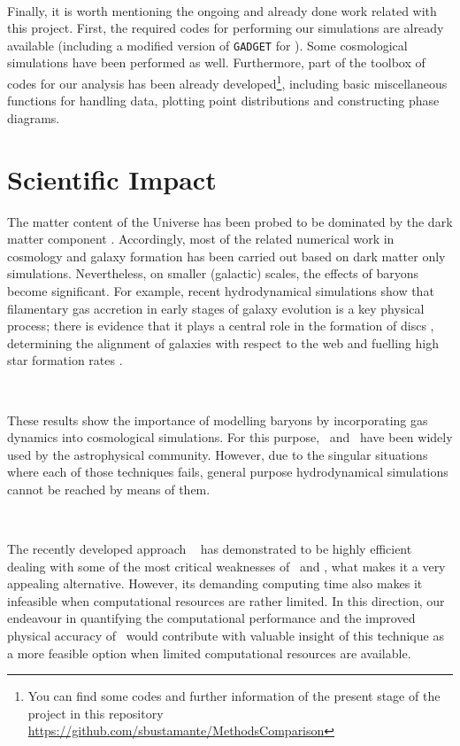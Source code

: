 \documentclass[a4,useAMS,usenatbib,usegraphicx,12pt]{article}
\begin{document}
\

Finally, it is worth mentioning the ongoing and already done work related with 
this project. First, the required codes for performing our simulations are already
available (including a modified version of \texttt{GADGET} for \VPH). Some
cosmological simulations have been performed as well. Furthermore, part of the 
toolbox of codes for our analysis has been already developed\footnote{You can 
find some codes and further information of the present stage of the project in 
this repository \url{https://github.com/sbustamante/MethodsComparison}}, 
including basic miscellaneous functions for handling data, plotting point 
distributions and constructing phase diagrams.


\section{Scientific Impact}
The matter content of the Universe has been probed to be dominated by the dark 
matter component \citep{Planck13XVI}. Accordingly, most of the related numerical 
work in cosmology and galaxy formation has been carried out based on dark matter 
only simulations. Nevertheless, on smaller (galactic) scales, the effects of 
baryons become significant. For example, recent hydrodynamical simulations show 
that filamentary gas accretion in early stages of galaxy evolution is a key 
physical process; there is evidence that it plays a central role in the formation 
of discs \citep{Dubois14}, determining the alignment of galaxies with respect to 
the web \citep{Hahn10} and fuelling high star formation rates \citep{Dekel09}.

\

These results show the importance of modelling baryons by incorporating gas 
dynamics into cosmological simulations. For this purpose, \AMR\ and \SPH\ have
been widely used by the astrophysical community. However, due to the singular 
situations where each of those techniques fails, general purpose hydrodynamical
simulations cannot be reached by means of them.

\

The recently developed approach \AREPO\ \citet{Springel10} has demonstrated to 
be highly efficient dealing with some of the most critical weaknesses of \AMR\ 
and \SPH, what makes it a very appealing alternative. However, its demanding 
computing time also makes it infeasible when computational resources are rather 
limited. In this direction, our endeavour in quantifying the computational 
performance and the improved physical accuracy of \VPH\ would contribute with 
valuable insight of this technique as a more feasible option when limited 
computational resources are available.
\end{document}
